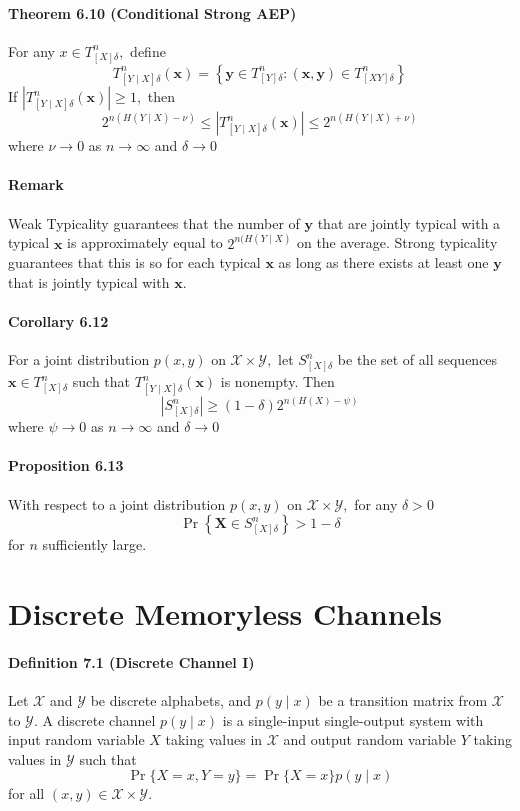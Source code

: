 \documentclass[8pt]{article}
\begin{document}
\paragraph{Theorem 6.10 (Conditional Strong AEP)} For any $x \in T_{[X] \delta}^{n},$ define
$$
T_{[Y \mid X] \delta}^{n}(\mathbf{x})=\left\{\mathbf{y} \in T_{[Y] \delta}^{n}:(\mathbf{x}, \mathbf{y}) \in T_{[X Y] \delta}^{n}\right\}
$$
If $\left|T_{[Y \mid X] \delta}^{n}(\mathbf{x})\right| \geq 1,$ then
$$
2^{n(H(Y \mid X)-\nu)} \leq\left|T_{[Y \mid X] \delta}^{n}(\mathbf{x})\right| \leq 2^{n(H(Y \mid X)+\nu)}
$$
where $\nu \rightarrow 0$ as $n \rightarrow \infty$ and $\delta \rightarrow 0$
\paragraph{Remark} Weak Typicality guarantees that the number of $\mathbf{y}$ that are jointly typical with a typical $\mathbf{x}$ is approximately equal to $2^{n(H(Y \mid X)}$ on the average. Strong typicality guarantees that this is so for each typical $\mathbf{x}$ as long as there exists at least one $\mathbf{y}$ that is jointly typical with $\mathbf{x}$.

\paragraph{Corollary 6.12} For a joint distribution $p(x, y)$ on $\mathcal{X} \times \mathcal{Y},$ let $S_{[X] \delta}^{n}$ be the set of all sequences $\mathbf{x} \in T_{[X] \delta}^{n}$ such that $T_{[Y \mid X] \delta}^{n}(\mathbf{x})$ is nonempty. Then
$$
\left|S_{[X] \delta}^{n}\right| \geq(1-\delta) 2^{n(H(X)-\psi)}
$$
where $\psi \rightarrow 0$ as $n \rightarrow \infty$ and $\delta \rightarrow 0$

\paragraph{Proposition 6.13} With respect to a joint distribution $p(x, y)$ on $\mathcal{X} \times \mathcal{Y},$ for any $\delta>0$
$$
\operatorname{Pr}\left\{\mathbf{X} \in S_{[X] \delta}^{n}\right\}>1-\delta
$$
for $n$ sufficiently large.

\section{Discrete Memoryless Channels}
\paragraph{Definition 7.1 (Discrete Channel I)} Let $\mathcal{X}$ and $\mathcal{Y}$ be discrete alphabets, and $p(y \mid x)$ be a transition matrix from $\mathcal{X}$ to $\mathcal{Y}$. A discrete channel $p(y \mid x)$ is a single-input single-output system with input random variable $X$ taking values in $\mathcal{X}$ and output random variable $Y$ taking values in $\mathcal{Y}$ such that
$$
\operatorname{Pr}\{X=x, Y=y\}=\operatorname{Pr}\{X=x\} p(y \mid x)
$$
for all $(x, y) \in \mathcal{X} \times \mathcal{Y}$.
\end{document}
